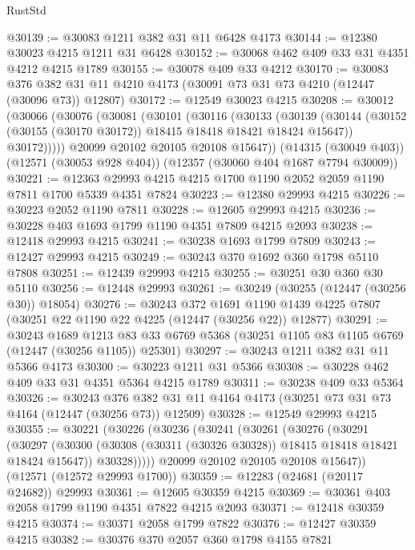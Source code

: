 \begin{lexlean}{RustStd}
\begin{coremodule}
@30139 := @30083 @1211 @382 @31 @11 @6428 @4173
@30144 := @12380 @30023 @4215 @1211 @31 @6428
@30152 := @30068 @462 @409 @33 @31 @4351 @4212 @4215 @1789
@30155 := @30078 @409 @33 @4212
@30170 := @30083
    @376
    @382
    @31
    @11
    @4210
    @4173
    (@30091 @73 @31 @73 @4210 (@12447 (@30096 @73)) @12807)
@30172 := @12549 @30023 @4215
@30208 := @30012
    (@30066
      (@30076
        (@30081
          (@30101
            (@30116
              (@30133
                (@30139
                  (@30144 (@30152 (@30155 (@30170 @30172)) @18415 @18418 @18421 @18424 @15647))
                  @30172)))))
        @20099
        @20102
        @20105
        @20108
        @15647))
    (@14315 (@30049 @403))
    (@12571 (@30053 @928 @404))
    (@12357 (@30060 @404 @1687 @7794 @30009))
@30221 := @12363 @29993 @4215 @4215 @1700 @1190 @2052 @2059 @1190 @7811 @1700 @5339 @4351 @7824
@30223 := @12380 @29993 @4215
@30226 := @30223 @2052 @1190 @7811
@30228 := @12605 @29993 @4215
@30236 := @30228 @403 @1693 @1799 @1190 @4351 @7809 @4215 @2093
@30238 := @12418 @29993 @4215
@30241 := @30238 @1693 @1799 @7809
@30243 := @12427 @29993 @4215
@30249 := @30243 @370 @1692 @360 @1798 @5110 @7808
@30251 := @12439 @29993 @4215
@30255 := @30251 @30 @360 @30 @5110
@30256 := @12448 @29993
@30261 := @30249 (@30255 (@12447 (@30256 @30)) @18054)
@30276 := @30243
    @372
    @1691
    @1190
    @1439
    @4225
    @7807
    (@30251 @22 @1190 @22 @4225 (@12447 (@30256 @22)) @12877)
@30291 := @30243
    @1689
    @1213
    @83
    @33
    @6769
    @5368
    (@30251 @1105 @83 @1105 @6769 (@12447 (@30256 @1105)) @25301)
@30297 := @30243 @1211 @382 @31 @11 @5366 @4173
@30300 := @30223 @1211 @31 @5366
@30308 := @30228 @462 @409 @33 @31 @4351 @5364 @4215 @1789
@30311 := @30238 @409 @33 @5364
@30326 := @30243
    @376
    @382
    @31
    @11
    @4164
    @4173
    (@30251 @73 @31 @73 @4164 (@12447 (@30256 @73)) @12509)
@30328 := @12549 @29993 @4215
@30355 := @30221
    (@30226
      (@30236
        (@30241
          (@30261
            (@30276
              (@30291
                (@30297
                  (@30300 (@30308 (@30311 (@30326 @30328)) @18415 @18418 @18421 @18424 @15647))
                  @30328)))))
        @20099
        @20102
        @20105
        @20108
        @15647))
    (@12571 (@12572 @29993 @1700))
@30359 := @12283 (@24681 (@20117 @24682)) @29993
@30361 := @12605 @30359 @4215
@30369 := @30361 @403 @2058 @1799 @1190 @4351 @7822 @4215 @2093
@30371 := @12418 @30359 @4215
@30374 := @30371 @2058 @1799 @7822
@30376 := @12427 @30359 @4215
@30382 := @30376 @370 @2057 @360 @1798 @4155 @7821

\end{coremodule}
\end{lexlean}

